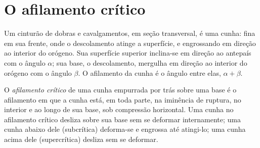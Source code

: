 \begin{omfigure}
\par{}\label{fig:b3:orogenic-wedges:duplex}
\end{omfigure}


\section{O afilamento crítico}\label{sec:b3:orogenic-wedges:taper}

Um cinturão de dobras e cavalgamentos, em seção transversal, é uma cunha: fina em sua frente, onde
o descolamento atinge a superfície, e engrossando em direção ao interior do orógeno.
Sua superfície superior inclina-se em direção ao antepaís com o ângulo $\alpha$; sua
base, o descolamento, mergulha em direção ao interior do orógeno com o ângulo $\beta$. O
afilamento da cunha é o ângulo entre elas, $\alpha + \beta$.

\begin{definition}\label{def:b3:orogenic-wedges:critical-taper}
O \emph{afilamento crítico} de uma cunha empurrada por trás
sobre uma base é o afilamento em que a cunha está, em toda parte, na iminência de
ruptura, no interior e ao longo de sua base, sob compressão horizontal. Uma cunha no
afilamento crítico desliza sobre sua base sem se deformar internamente; uma
cunha abaixo dele (subcrítica) deforma-se e engrossa até atingi-lo; uma
cunha acima dele (supercrítica) desliza sem se deformar.
\end{definition}

